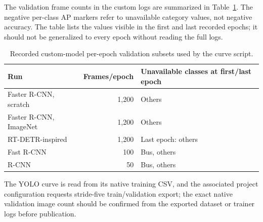 The validation frame counts in the custom logs are summarized in Table~\ref{tab:curve-subsets}. The negative per-class AP markers refer to unavailable category values, not negative accuracy. The table lists the values visible in the first and last recorded epochs; it should not be generalized to every epoch without reading the full logs.
\begin{table}[htbp]
\centering
\caption{Recorded custom-model per-epoch validation subsets used by the curve script.}
\label{tab:curve-subsets}
\begin{tabular}{lrl}
\toprule
Run & Frames/epoch & Unavailable classes at first/last epoch \\
\midrule
Faster R-CNN, scratch & 1,200 & Others \\
Faster R-CNN, ImageNet & 1,200 & Others \\
RT-DETR-inspired & 1,200 & Last epoch: others \\
Fast R-CNN & 100 & Bus, others \\
R-CNN & 50 & Bus, others \\
\bottomrule
\end{tabular}
\end{table}
The YOLO curve is read from its native training CSV, and the associated project configuration requests stride-five train/validation export; the exact native validation image count should be confirmed from the exported dataset or trainer logs before publication.

